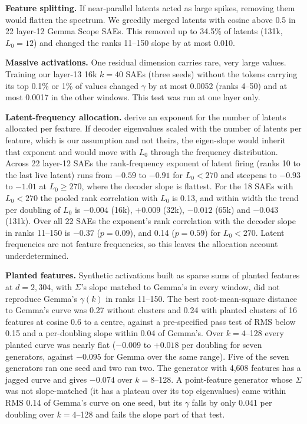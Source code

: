 \documentclass{article}
\newcommand{\Sig}{\Sigma}
\newcommand{\Lz}{L_0}
\begin{document}
\textbf{Feature splitting.} If near-parallel latents acted as large spikes, removing them would flatten the spectrum. We greedily merged latents with cosine above 0.5 in 22 layer-12 Gemma Scope SAEs. This removed up to 34.5\% of latents (131k, $\Lz=12$) and changed the ranks 11--150 slope by at most 0.010.

\textbf{Massive activations.} One residual dimension carries rare, very large values. Training our layer-13 16k $k=40$ SAEs (three seeds) without the tokens carrying its top 0.1\% or 1\% of values changed $\gamma$ by at most 0.0052 (ranks 4--50) and at most 0.0017 in the other windows. This test was run at one layer only.

\textbf{Latent-frequency allocation.} \citet{michaud2025manifolds} derive an exponent for the number of latents allocated per feature. If decoder eigenvalues scaled with the number of latents per feature, which is our assumption and not theirs, the eigen-slope would inherit that exponent and would move with $\Lz$ through the frequency distribution. Across 22 layer-12 SAEs the rank-frequency exponent of latent firing (ranks 10 to the last live latent) runs from $-0.59$ to $-0.91$ for $\Lz < 270$ and steepens to $-0.93$ to $-1.01$ at $\Lz \ge 270$, where the decoder slope is flattest. For the 18 SAEs with $\Lz < 270$ the pooled rank correlation with $\Lz$ is 0.13, and within width the trend per doubling of $\Lz$ is $-0.004$ (16k), $+0.009$ (32k), $-0.012$ (65k) and $-0.043$ (131k). Over all 22 SAEs the exponent's rank correlation with the decoder slope in ranks 11--150 is $-0.37$ ($p=0.09$), and 0.14 ($p=0.59$) for $\Lz < 270$. Latent frequencies are not feature frequencies, so this leaves the allocation account underdetermined.

\textbf{Planted features.} Synthetic activations built as sparse sums of planted features at $d=2{,}304$, with $\Sig$'s slope matched to Gemma's in every window, did not reproduce Gemma's $\gamma(k)$ in ranks 11--150. The best root-mean-square distance to Gemma's curve was 0.27 without clusters and 0.24 with planted clusters of 16 features at cosine 0.6 to a centre, against a pre-specified pass test of RMS below 0.15 and a per-doubling slope within 0.04 of Gemma's. Over $k=4$--128 every planted curve was nearly flat ($-0.009$ to $+0.018$ per doubling for seven generators, against $-0.095$ for Gemma over the same range). Five of the seven generators ran one seed and two ran two. The generator with 4,608 features has a jagged curve and gives $-0.074$ over $k=8$--128. A point-feature generator whose $\Sig$ was not slope-matched (it has a plateau over its top eigenvalues) came within RMS 0.14 of Gemma's curve on one seed, but its $\gamma$ falls by only 0.041 per doubling over $k=4$--128 and fails the slope part of that test.
\end{document}
